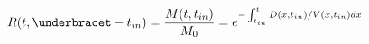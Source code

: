 \begin{equation}
R(t,\underbracet-t_{in}) = \frac{M(t,t_{in})}{M_0} = e^{-\int_{t_{in}}^t D(x,t_{in})/V(x,t_{in}) dx}
\end{equation}